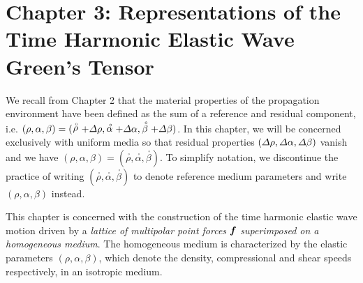 \documentclass[11pt,a4paper]{article}
\newcommand{\bmi}[1]{\mbox{\boldmath$\mit #1$\unboldmath}}
\newcommand{\rf}[1]{\stackrel{\scriptscriptstyle _{\,\,\circ}}{ #1}}
\begin{document}
\section*{Chapter 3: Representations of the Time Harmonic Elastic Wave Green's Tensor}

We recall from Chapter 2 that
 the material
properties of the propagation environment have been defined as
the sum of a reference and residual component, i.e.
$(\rho, \alpha, \beta)=(\rf{\rho}+{\mit \Delta}\rho,\rf{\alpha}+{\mit
\Delta}\alpha,\rf{\beta}+{\mit \Delta}\beta)$. In this chapter, we will
be concerned exclusively with uniform media so that
residual properties $({\mit \Delta}\rho,{\mit
\Delta}\alpha,{\mit \Delta}\beta)$ vanish and we have
$(\rho, \alpha, \beta)=(\rf{\rho},\rf{\alpha},\rf{\beta})$. To simplify
notation, we discontinue the practice of writing  $(\rf{\rho},\rf{\alpha},\rf{\beta})$
to denote reference medium parameters and write
$({\rho},{\alpha},{\beta})$ instead.

This chapter is concerned with the construction of the time harmonic
elastic wave motion driven by a {\em lattice of multipolar point forces\/}
${\bmi f}$ {\em  superimposed on a homogeneous medium\/}.
The homogeneous medium is
characterized by the  elastic parameters $(\rho,\alpha,\beta)$, which
denote the density, compressional and shear speeds respectively, in an
isotropic medium.
\end{document}
